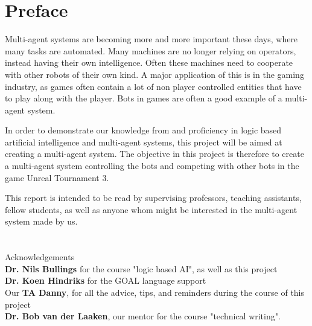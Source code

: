 \chapter*{Preface}
Multi-agent systems are becoming more and more important these days, where many tasks are automated. Many machines are no longer relying on operators, instead having their own intelligence. Often these machines need to cooperate with other robots of their own kind. A major application of this is in the gaming industry, as games often contain a lot of non player controlled entities that have to play along with the player. Bots in games are often a good example of a multi-agent system.

In order to demonstrate our knowledge from and proficiency in logic based artificial intelligence and multi-agent systems, this project will be aimed at creating a multi-agent system. The objective in this project is therefore to create a multi-agent system controlling the bots and competing with other bots in the game Unreal Tournament 3. 
    
This report is intended to be read by supervising professors, teaching assistants, fellow students, as well as anyone whom might be interested in the multi-agent system made by us.
\\
\\
\\
Acknowledgements \\
    \textbf{Dr. Nils Bullings} for the course "logic based AI", as well as this project \\
    \textbf{Dr. Koen Hindriks} for the GOAL language support \\
    Our \textbf{TA Danny}, for all the advice, tips, and reminders during the course of this project \\
    \textbf{Dr. Bob van der Laaken}, our mentor for the course "technical writing". \\
